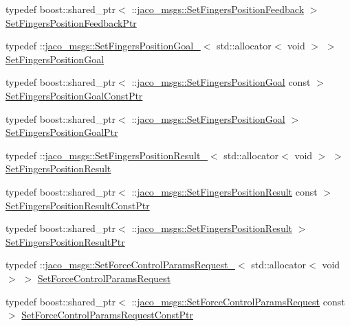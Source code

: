 \begin{DoxyCompactItemize}
\item 
typedef boost\+::shared\+\_\+ptr$<$ \+::\hyperlink{namespacejaco__msgs_a27b05a5ba36d09c1620de5791e2362d0}{jaco\+\_\+msgs\+::\+Set\+Fingers\+Position\+Feedback} $>$ \hyperlink{namespacejaco__msgs_a36fc7cf1f2876946c317d3c56f245b24}{Set\+Fingers\+Position\+Feedback\+Ptr}
\item 
typedef \+::\hyperlink{structjaco__msgs_1_1SetFingersPositionGoal__}{jaco\+\_\+msgs\+::\+Set\+Fingers\+Position\+Goal\+\_\+}$<$ std\+::allocator$<$ void $>$ $>$ \hyperlink{namespacejaco__msgs_a3a39b1d113922c8426dca543c0a63e5e}{Set\+Fingers\+Position\+Goal}
\item 
typedef boost\+::shared\+\_\+ptr$<$ \+::\hyperlink{namespacejaco__msgs_a3a39b1d113922c8426dca543c0a63e5e}{jaco\+\_\+msgs\+::\+Set\+Fingers\+Position\+Goal} const  $>$ \hyperlink{namespacejaco__msgs_a4432ef01b2858fafbc445a38e7c6dcba}{Set\+Fingers\+Position\+Goal\+Const\+Ptr}
\item 
typedef boost\+::shared\+\_\+ptr$<$ \+::\hyperlink{namespacejaco__msgs_a3a39b1d113922c8426dca543c0a63e5e}{jaco\+\_\+msgs\+::\+Set\+Fingers\+Position\+Goal} $>$ \hyperlink{namespacejaco__msgs_af6a0d40b47aaa8ea0abb9a71882ba8f3}{Set\+Fingers\+Position\+Goal\+Ptr}
\item 
typedef \+::\hyperlink{structjaco__msgs_1_1SetFingersPositionResult__}{jaco\+\_\+msgs\+::\+Set\+Fingers\+Position\+Result\+\_\+}$<$ std\+::allocator$<$ void $>$ $>$ \hyperlink{namespacejaco__msgs_a8e55cc3036f6b7bfa0fbc5712715ec42}{Set\+Fingers\+Position\+Result}
\item 
typedef boost\+::shared\+\_\+ptr$<$ \+::\hyperlink{namespacejaco__msgs_a8e55cc3036f6b7bfa0fbc5712715ec42}{jaco\+\_\+msgs\+::\+Set\+Fingers\+Position\+Result} const  $>$ \hyperlink{namespacejaco__msgs_a1a5dd085ab24f499552dec04402bceb8}{Set\+Fingers\+Position\+Result\+Const\+Ptr}
\item 
typedef boost\+::shared\+\_\+ptr$<$ \+::\hyperlink{namespacejaco__msgs_a8e55cc3036f6b7bfa0fbc5712715ec42}{jaco\+\_\+msgs\+::\+Set\+Fingers\+Position\+Result} $>$ \hyperlink{namespacejaco__msgs_a343e6682b2f68e3ff22370633a5b08fb}{Set\+Fingers\+Position\+Result\+Ptr}
\item 
typedef \+::\hyperlink{structjaco__msgs_1_1SetForceControlParamsRequest__}{jaco\+\_\+msgs\+::\+Set\+Force\+Control\+Params\+Request\+\_\+}$<$ std\+::allocator$<$ void $>$ $>$ \hyperlink{namespacejaco__msgs_a3486b7826c8a999135bb2eded905e7a8}{Set\+Force\+Control\+Params\+Request}
\item 
typedef boost\+::shared\+\_\+ptr$<$ \+::\hyperlink{namespacejaco__msgs_a3486b7826c8a999135bb2eded905e7a8}{jaco\+\_\+msgs\+::\+Set\+Force\+Control\+Params\+Request} const  $>$ \hyperlink{namespacejaco__msgs_a0b57aa518c819516dbdb7a991e89c945}{Set\+Force\+Control\+Params\+Request\+Const\+Ptr}

\end{DoxyCompactItemize}
